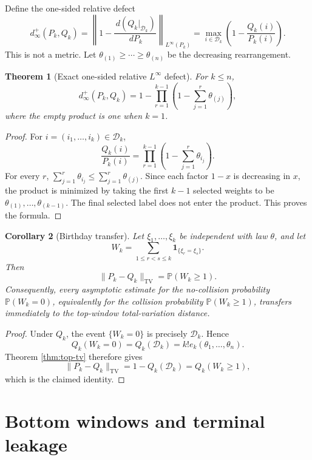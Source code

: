 \documentclass[11pt]{article}
\newtheorem{theorem}{Theorem}[section]
\newtheorem{corollary}[theorem]{Corollary}
\theoremstyle{remark}
\newcommand{\Pp}{\mathbb P}
\newcommand{\one}{\mathbf 1}
\newcommand{\TV}{\mathrm{TV}}
\newcommand{\dd}{\,d}
\newcommand{\calD}{\mathcal D}
\begin{document}
Define the one-sided relative defect
\[
 d_\infty^+(P_k,Q_k)
 =\left\|1-\frac{\dd(Q_k|_{\calD_k})}{\dd P_k}
 \right\|_{L^\infty(P_k)}
 =\max_{i\in\calD_k}
 \left(1-\frac{Q_k(i)}{P_k(i)}\right).
\]
This is not a metric.  Let
\(\theta_{(1)}\ge\cdots\ge\theta_{(n)}\) be the decreasing rearrangement.

\begin{theorem}[Exact one-sided relative $L^\infty$ defect]
\label{thm:dinfty}
For \(k\le n\),
\[
        d_\infty^+(P_k,Q_k)
        =1-\prod_{r=1}^{k-1}
        \left(1-\sum_{j=1}^r\theta_{(j)}\right),
\]
where the empty product is one when $k=1$.
\end{theorem}

\begin{proof}
For \(i=(i_1,\ldots,i_k)\in\calD_k\),
\[
        \frac{Q_k(i)}{P_k(i)}
        =\prod_{r=1}^{k-1}
        \left(1-\sum_{j=1}^r\theta_{i_j}\right).
\]
For every \(r\), \(\sum_{j=1}^r\theta_{i_j}\le \sum_{j=1}^r\theta_{(j)}\).  Since each factor \(1-x\) is decreasing in \(x\), the product is minimized by taking the first \(k-1\) selected weights to be \(\theta_{(1)},\ldots,\theta_{(k-1)}\).  The final selected label does not enter the product.  This proves the formula.
\end{proof}

\begin{corollary}[Birthday transfer]\label{cor:birthday}
Let \(\xi_1,\ldots,\xi_k\) be independent with law \(\theta\), and let
\[
        W_k=\sum_{1\le r<s\le k}\one_{\{\xi_r=\xi_s\}}.
\]
Then
\[
        \|P_k-Q_k\|_{\TV}=\Pp(W_k\ge1).
\]
Consequently, every asymptotic estimate for the no-collision probability
$\Pp(W_k=0)$, equivalently for the collision probability $\Pp(W_k\ge1)$,
transfers immediately to the top-window total-variation distance.
\end{corollary}

\begin{proof}
Under \(Q_k\), the event \(\{W_k=0\}\) is precisely \(\calD_k\).  Hence
\[
        Q_k(W_k=0)=Q_k(\calD_k)=k!e_k(\theta_1,\ldots,\theta_n).
\]
Theorem \ref{thm:top-tv} therefore gives
\[
        \|P_k-Q_k\|_{\TV}=1-Q_k(\calD_k)=Q_k(W_k\ge1),
\]
which is the claimed identity.
\end{proof}

\section{Bottom windows and terminal leakage}
\end{document}
